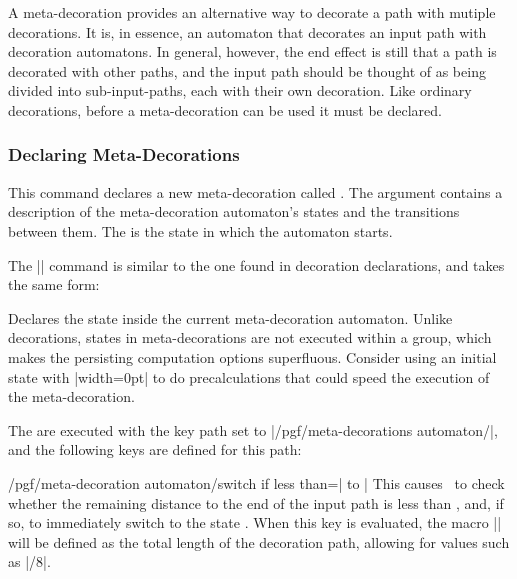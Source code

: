 \label{section-base-meta-decorations}

A meta-decoration provides an alternative way to decorate a path with 
mutiple decorations. It is, in essence, an automaton that decorates
an input path with decoration automatons. In general, however, the end
effect is still that a path is decorated with other paths, and the input 
path should be thought of as being divided into sub-input-paths, each with 
their own decoration. Like ordinary decorations, before a
meta-decoration can be used it must be declared.

\subsubsection{Declaring Meta-Decorations}

\begin{command}{\pgfdeclaremetadecorate{}}

  This command declares a new meta-decoration called . The
   argument contains a description of the meta-decoration
  automaton's states and the transitions between them. The
   is the state in which the automaton starts.
  
  The |\state| command is similar to the one found in 
  decoration declarations, and takes the same form:
  
  \begin{command}{\state{}}
    Declares the state  inside the current meta-decoration
    automaton. Unlike decorations, states in meta-decorations are not
    executed within a group, which makes the persisting computation
    options superfluous. Consider using an initial state with
    |width=0pt| to do precalculations that could speed the execution
    of the meta-decoration. 
    
    The  are executed with the key path set to
    |/pgf/meta-decorations automaton/|, and the following keys are defined for 
    this path: 
    
    \begin{key}{/pgf/meta-decoration automaton/switch if less than=| to |}
      This causes \pgfname\ to check whether the
      remaining distance to the end of the input path is less than
      , and, if so, to immediately switch to the state 
      . When this key is evaluated, the macro 
      |\pgfmetadecoratedpathlength| will be defined as the total length of 
      the decoration path, allowing for values such as
      |\pgfmetadecoratedpathlength/8|.
    \end{key}
    

\end{command}
\end{command}
